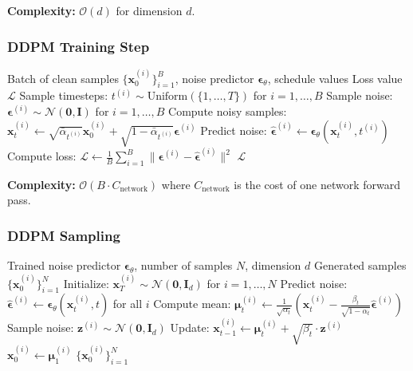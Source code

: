 \textbf{Complexity:} $\mathcal{O}(d)$ for dimension $d$.

\subsubsection{DDPM Training Step}

\begin{algorithm}[H]
\caption{DDPM Training Step}
\label{alg:ddpm_training_step}
\begin{algorithmic}[1]
\REQUIRE Batch of clean samples $\{\mathbf{x}_0^{(i)}\}_{i=1}^B$, noise predictor $\boldsymbol{\epsilon}_\theta$, schedule values
\ENSURE Loss value $\mathcal{L}$
\STATE Sample timesteps: $t^{(i)} \sim \text{Uniform}(\{1, \ldots, T\})$ for $i = 1, \ldots, B$
\STATE Sample noise: $\boldsymbol{\epsilon}^{(i)} \sim \mathcal{N}(\mathbf{0}, \mathbf{I})$ for $i = 1, \ldots, B$
\STATE Compute noisy samples: $\mathbf{x}_t^{(i)} \gets \sqrt{\bar{\alpha}_{t^{(i)}}} \mathbf{x}_0^{(i)} + \sqrt{1-\bar{\alpha}_{t^{(i)}}} \boldsymbol{\epsilon}^{(i)}$
\STATE Predict noise: $\hat{\boldsymbol{\epsilon}}^{(i)} \gets \boldsymbol{\epsilon}_\theta(\mathbf{x}_t^{(i)}, t^{(i)})$
\STATE Compute loss: $\mathcal{L} \gets \frac{1}{B}\sum_{i=1}^B \|\boldsymbol{\epsilon}^{(i)} - \hat{\boldsymbol{\epsilon}}^{(i)}\|^2$
\RETURN $\mathcal{L}$
\end{algorithmic}
\end{algorithm}

\textbf{Complexity:} $\mathcal{O}(B \cdot C_{\text{network}})$ where $C_{\text{network}}$ is the cost of one network forward pass.

\subsubsection{DDPM Sampling}

\begin{algorithm}[H]
\caption{DDPM Sampling}
\label{alg:ddpm_sampling_full}
\begin{algorithmic}[1]
\REQUIRE Trained noise predictor $\boldsymbol{\epsilon}_\theta$, number of samples $N$, dimension $d$
\ENSURE Generated samples $\{\mathbf{x}_0^{(i)}\}_{i=1}^N$
\STATE Initialize: $\mathbf{x}_T^{(i)} \sim \mathcal{N}(\mathbf{0}, \mathbf{I}_d)$ for $i = 1, \ldots, N$
    \STATE Predict noise: $\hat{\boldsymbol{\epsilon}}^{(i)} \gets \boldsymbol{\epsilon}_\theta(\mathbf{x}_t^{(i)}, t)$ for all $i$
    \STATE Compute mean: $\boldsymbol{\mu}_t^{(i)} \gets \frac{1}{\sqrt{\alpha_t}}\left(\mathbf{x}_t^{(i)} - \frac{\beta_t}{\sqrt{1-\bar{\alpha}_t}}\hat{\boldsymbol{\epsilon}}^{(i)}\right)$
        \STATE Sample noise: $\mathbf{z}^{(i)} \sim \mathcal{N}(\mathbf{0}, \mathbf{I}_d)$
        \STATE Update: $\mathbf{x}_{t-1}^{(i)} \gets \boldsymbol{\mu}_t^{(i)} + \sqrt{\beta_t} \cdot \mathbf{z}^{(i)}$
    \ELSE
        \STATE $\mathbf{x}_0^{(i)} \gets \boldsymbol{\mu}_1^{(i)}$
    \ENDIF
\ENDFOR
\RETURN $\{\mathbf{x}_0^{(i)}\}_{i=1}^N$
\end{algorithmic}
\end{algorithm}


